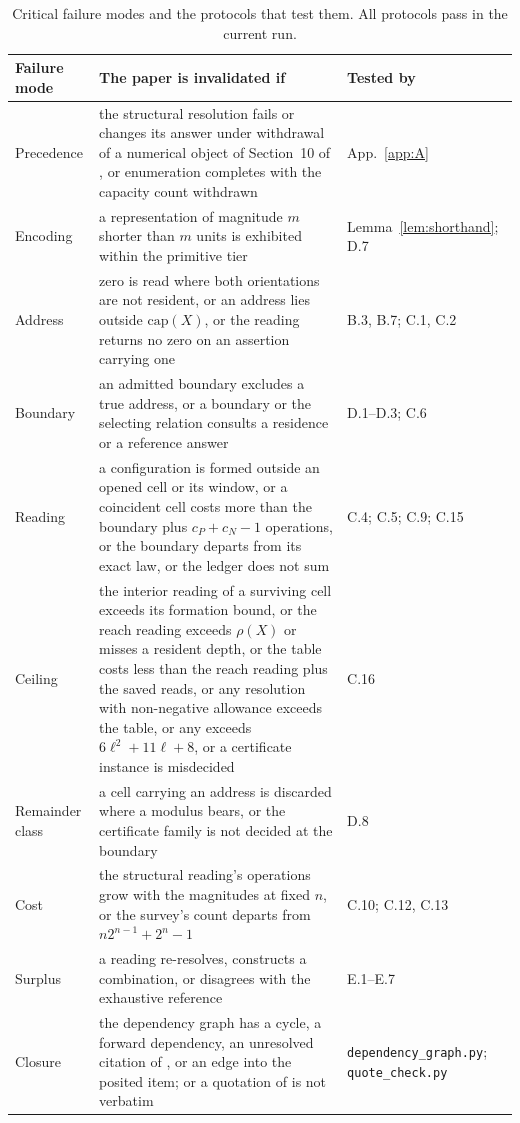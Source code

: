 \documentclass[pdflatex,sn-mathphys-num]{sn-jnl}
\theoremstyle{thmstyleone}%
\theoremstyle{thmstyletwo}%
\theoremstyle{thmstylethree}%
\newcommand{\PA}{\cite{Swanagon2026PA}}
\begin{document}
\begin{table}[!htbp]
\centering\small
\caption{Critical failure modes and the protocols that test them. All protocols pass in the current run.}
\label{tab:failure}
\renewcommand{\arraystretch}{1.2}
\begin{tabular}{@{} p{} p{} p{} @{}}
\toprule
\textbf{Failure mode} & \textbf{The paper is invalidated if} & \textbf{Tested by} \\
\midrule
Precedence & the structural resolution fails or changes its answer under withdrawal of a numerical object of Section~10 of \PA{}, or enumeration completes with the capacity count withdrawn & App.~\ref{app:A} \\
Encoding & a representation of magnitude $m$ shorter than $m$ units is exhibited within the primitive tier & Lemma~\ref{lem:shorthand}; D.7 \\
Address & zero is read where both orientations are not resident, or an address lies outside $\mathrm{cap}(X)$, or the reading returns no zero on an assertion carrying one & B.3, B.7; C.1, C.2 \\
Boundary & an admitted boundary excludes a true address, or a boundary or the selecting relation consults a residence or a reference answer & D.1--D.3; C.6 \\
Reading & a configuration is formed outside an opened cell or its window, or a coincident cell costs more than the boundary plus $c_P+c_N-1$ operations, or the boundary departs from its exact law, or the ledger does not sum & C.4; C.5; C.9; C.15 \\
Ceiling & the interior reading of a surviving cell exceeds its formation bound, or the reach reading exceeds $\rho(X)$ or misses a resident depth, or the table costs less than the reach reading plus the saved reads, or any resolution with non-negative allowance exceeds the table, or any exceeds $6\ell^2+11\ell+8$, or a certificate instance is misdecided & C.16 \\
Remainder class & a cell carrying an address is discarded where a modulus bears, or the certificate family is not decided at the boundary & D.8 \\
Cost & the structural reading's operations grow with the magnitudes at fixed $n$, or the survey's count departs from $n2^{n-1}+2^n-1$ & C.10; C.12, C.13 \\
Surplus & a reading re-resolves, constructs a combination, or disagrees with the exhaustive reference & E.1--E.7 \\
Closure & the dependency graph has a cycle, a forward dependency, an unresolved citation of \PA{}, or an edge into the posited item; or a quotation of \PA{} is not verbatim & \texttt{dependency\_graph.py}; \texttt{quote\_check.py} \\
\bottomrule
\end{tabular}
\end{table}
\end{document}
